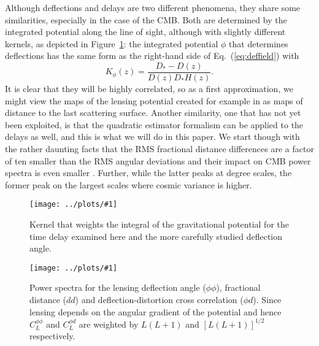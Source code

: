 \documentclass[prd,amsmath,amssymb,floatfix,superscriptaddress,nofootinbib,twocolumn]{revtex4-1}
\def\be{\begin{equation}}
\def\ee{\end{equation}}
\newcommand{\ec}[1]{Eq.~(\ref{eq:#1})}
\newcommand{\sfig}[2]{
\texttt{[image: ../plots/\#1]}
        }
\newcommand{\Sfig}[2]{
   \begin{figure}[thbp]
   \begin{center}
    \sfig{#1.pdf}{\columnwidth}
    \caption{{\small #2}}
    \label{fig:#1}
     \end{center}
   \end{figure}
}
\newcommand{\rf}[1]{\ref{fig:#1}}
\newcommand{\scott}[1]{{\color{darkgreen} #1}}
\newcommand{\wh}[1]{{\color{red} #1}}
\begin{document}
Although deflections and delays are two different phenomena, they share some similarities, especially in the case of the CMB. Both are determined by the integrated potential along the line of sight, although with slightly different kernels, as depicted in Figure~\rf{kernel}: the integrated potential $\phi$ that determines deflections has the same form as the right-hand side of \ec{deffield}  with
\be
K_\phi(z) = \frac{D_*-D(z)}{ D(z) D_* H(z)} .
\ee
It is clear that they will be highly correlated, so as a first approximation, we might view the maps of the lensing potential created for example in \citet{Aghanim:2018oex} as maps of distance to the last scattering surface. Another similarity, one that has not yet been exploited, is that the quadratic estimator formalism  \cite{Hu:2001tn} can be applied to the delays as well, and this is what we will do in this paper.  We start though with the rather daunting facts that the RMS fractional distance differences are a factor of ten smaller than the RMS angular deviations 
 and their impact on CMB power spectra is even smaller \cite{Hu:2001yq}. Further, while the latter peaks at degree scales, the former peak on the largest scales where cosmic variance is
 higher.

\Sfig{kernel}{Kernel that weights the integral of the gravitational potential for the time delay examined here and the more carefully studied deflection angle.}
\Sfig{Spectrum}{Power spectra for the lensing deflection angle
($\phi\phi$), fractional distance ($dd$) and deflection-distortion cross correlation
($\phi d$). Since lensing depends on the angular gradient of the potential and hence $C_{L}^{\phi\phi}$ and $C_{L}^{\phi d}$ are weighted by $L(L+1)$ and $[L(L+1)]^{1/2}$ respectively.}
\end{document}
